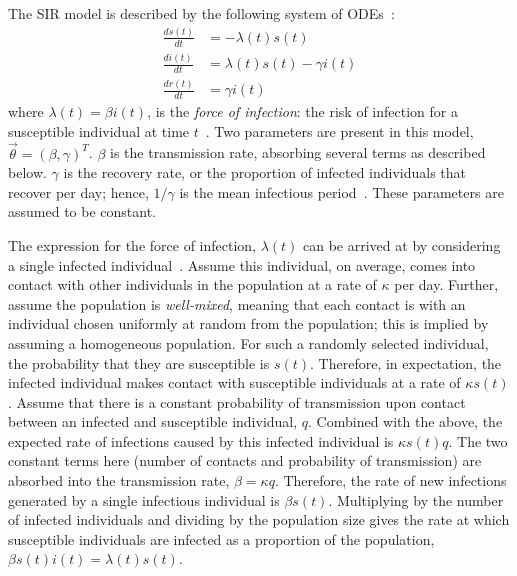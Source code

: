 \documentclass[thesis.tex]{subfiles}
\begin{document}
The SIR model is described by the following system of ODEs~\autocite[19]{keelingModeling}:
\begin{align}
\frac{ds(t)}{dt} &= -\lambda(t) s(t) \\
\frac{di(t)}{dt} &= \lambda(t) s(t) - \gamma i(t) \\
\frac{dr(t)}{dt} &= \gamma i(t)
\end{align}
where $\lambda(t) = \beta i(t)$, is the \emph{force of infection}: the risk of infection for a susceptible individual at time $t$~\autocite[17]{keelingModeling}.
Two parameters are present in this model, $\vec{\theta} = (\beta, \gamma)^T$.
$\beta$ is the transmission rate, absorbing several terms as described below.
$\gamma$ is the recovery rate, or the proportion of infected individuals that recover per day; hence, $1/\gamma$ is the mean infectious period~\autocite[367]{keelingModeling}.
These parameters are assumed to be constant.

The expression for the force of infection, $\lambda(t)$ can be arrived at by considering a single infected individual~\autocite[214]{kretzschmarMathematical}.
Assume this individual, on average, comes into contact with other individuals in the population at a rate of $\kappa$ per day.
Further, assume the population is \emph{well-mixed}, meaning that each contact is with an individual chosen uniformly at random from the population; this is implied by assuming a homogeneous population.
For such a randomly selected individual, the probability that they are susceptible is $s(t)$.
Therefore, in expectation, the infected individual makes contact with susceptible individuals at a rate of $\kappa s(t)$.
Assume that there is a constant probability of transmission upon contact between an infected and susceptible individual, $q$.
Combined with the above, the expected rate of infections caused by this infected individual is $\kappa s(t) q$.
The two constant terms here (number of contacts and probability of transmission) are absorbed into the transmission rate, $\beta = \kappa q$.
Therefore, the rate of new infections generated by a single infectious individual is $\beta s(t)$.
Multiplying by the number of infected individuals and dividing by the population size gives the rate at which susceptible individuals are infected as a proportion of the population, $\beta s(t) i(t) = \lambda(t) s(t)$.
\end{document}
